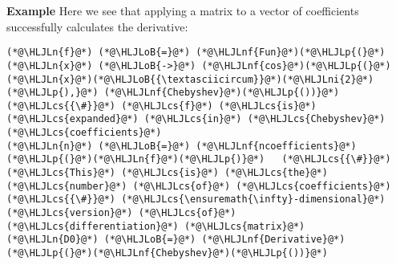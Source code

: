 \documentclass[12pt,landscape]{article}
\newcommand{\HLJLn}[1]{#1}
\newcommand{\HLJLnf}[1]{\textcolor[RGB]{66,102,213}{#1}}
\newcommand{\HLJLni}[1]{\textcolor[RGB]{59,151,46}{#1}}
\newcommand{\HLJLoB}[1]{\textcolor[RGB]{102,102,102}{\textbf{#1}}}
\newcommand{\HLJLp}[1]{#1}
\newcommand{\HLJLcs}[1]{\textcolor[RGB]{153,153,119}{\textit{#1}}}
\begin{document}
{\textbf{Example} Here we see that applying a matrix to a vector of coefficients successfully calculates the derivative:


\begin{lstlisting}
(*@\HLJLn{f}@*) (*@\HLJLoB{=}@*) (*@\HLJLnf{Fun}@*)(*@\HLJLp{(}@*)(*@\HLJLn{x}@*) (*@\HLJLoB{->}@*) (*@\HLJLnf{cos}@*)(*@\HLJLp{(}@*)(*@\HLJLn{x}@*)(*@\HLJLoB{{\textasciicircum}}@*)(*@\HLJLni{2}@*)(*@\HLJLp{),}@*) (*@\HLJLnf{Chebyshev}@*)(*@\HLJLp{())}@*)   (*@\HLJLcs{{\#}}@*) (*@\HLJLcs{f}@*) (*@\HLJLcs{is}@*) (*@\HLJLcs{expanded}@*) (*@\HLJLcs{in}@*) (*@\HLJLcs{Chebyshev}@*) (*@\HLJLcs{coefficients}@*)
(*@\HLJLn{n}@*) (*@\HLJLoB{=}@*) (*@\HLJLnf{ncoefficients}@*)(*@\HLJLp{(}@*)(*@\HLJLn{f}@*)(*@\HLJLp{)}@*)   (*@\HLJLcs{{\#}}@*) (*@\HLJLcs{This}@*) (*@\HLJLcs{is}@*) (*@\HLJLcs{the}@*) (*@\HLJLcs{number}@*) (*@\HLJLcs{of}@*) (*@\HLJLcs{coefficients}@*)
(*@\HLJLcs{{\#}}@*) (*@\HLJLcs{\ensuremath{\infty}-dimensional}@*) (*@\HLJLcs{version}@*) (*@\HLJLcs{of}@*) (*@\HLJLcs{differentiation}@*) (*@\HLJLcs{matrix}@*)
(*@\HLJLn{D0}@*) (*@\HLJLoB{=}@*) (*@\HLJLnf{Derivative}@*)(*@\HLJLp{(}@*)(*@\HLJLnf{Chebyshev}@*)(*@\HLJLp{())}@*)
\end{lstlisting}

}
\end{document}
